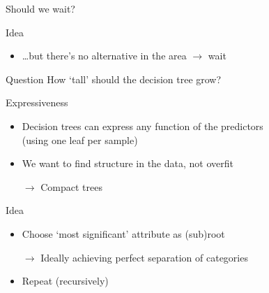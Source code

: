 \begin{frame}{Should we wait?}
{\begin{block}{Idea}
\begin{itemize}
\begin{itemize}
\begin{itemize}
                              \item \ldots but there's no alternative in the
                                     area $\rightarrow$ wait
                          \end{itemize}
                      \end{itemize}
            \end{itemize}
        \end{block}
        \vfill
        \begin{block}{Question}
            How `tall' should the decision tree grow?
        \end{block}}
\end{frame}

\begin{frame}{Expressiveness}
    \begin{itemize}
        \item Decision trees can express \alert{any} function of the predictors \\
              (using one leaf per sample) \\[\medskipamount]
        \item We want to find \alert{structure} in the data, not overfit
        \item[$\rightarrow$] Compact trees
    \end{itemize}
    \vfill\pause
    \begin{block}{Idea}
        \begin{itemize}
            \item Choose `most significant' attribute as (sub)root
            \item[$\rightarrow$] Ideally achieving perfect separation of categories \\[\medskipamount]
            \item Repeat (recursively)
        \end{itemize}
    \end{block}
\end{frame}

